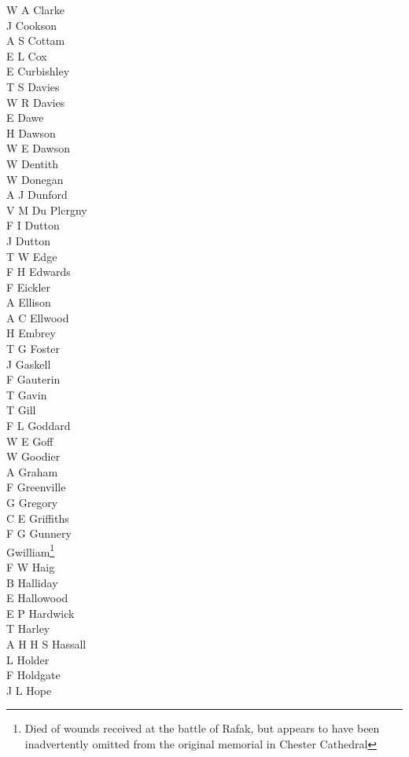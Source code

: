 \begin{multicols}{3}
  W A Clarke \\
  J Cookson \\
  A S Cottam \\
  E L Cox \\
  E Curbishley \\
  T S Davies \\
  W R Davies \\
  E Dawe \\
  H Dawson \\
  W E Dawson \\
  W Dentith \\
  W Donegan \\
  A J Dunford \\
  V M Du Plcrgny \\
  F I Dutton \\
  J Dutton \\
  T W Edge \\
  F H Edwards \\
  F Eickler \\
  A Ellison \\
  A C Ellwood \\
  H Embrey \\
  T G Foster \\
  J Gaskell \\
  F Gauterin \\
  T Gavin \\
  T Gill \\
  F L Goddard \\
  W E Goff \\
  W Goodier \\
  A Graham \\
  F Greenville \\
  G Gregory \\
  C E Griffiths \\
  F G Gunnery \\
  Gwilliam\footnote{Died of wounds received at the battle of Rafak, but appears to have been inadvertently omitted from the original memorial in Chester Cathedral} \\
  F W Haig \\
  B Halliday \\
  E Hallowood \\
  E P Hardwick \\
  T Harley \\
  A H H S Hassall \\
  L Holder \\
  F Holdgate \\
  J L Hope \\

\end{multicols}
